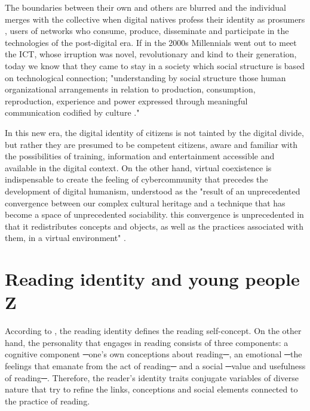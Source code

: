 \documentclass[english]{textolivre}
\begin{document}
The boundaries between their own and others are blurred and the individual merges with the collective when digital natives profess their identity as prosumers \cite{toffler_tercera_1981, friedman_tierra_2005, cassany2013leer}, users of networks who consume, produce, disseminate and participate in the technologies of the post-digital era. If in the 2000s Millennials went out to meet the ICT, whose irruption was novel, revolutionary and kind to their generation, today we know that they came to stay in a society which social structure is based on technological connection; "understanding by social structure those human organizational arrangements in relation to production, consumption, reproduction, experience and power expressed through meaningful communication codified by culture \cite[p.51]{castells_comunicacion_2009}."

In this new era, the digital identity of citizens is not tainted by the digital divide, but rather they are presumed to be competent citizens, aware and familiar with the possibilities of training, information and entertainment accessible and available in the digital context. On the other hand, virtual coexistence is indispensable to create the feeling of cybercommunity that precedes the development of digital humanism, understood as the "result of an unprecedented convergence between our complex cultural heritage and a technique that has become a space of unprecedented sociability. this convergence is unprecedented in that it redistributes concepts and objects, as well as the practices associated with them, in a virtual environment" \cite[p.33]{doueihi2011humanismo}.



\section{Reading identity and young people Z}
According to \textcite{aliagas_aunque_2009}, the reading identity defines the reading self-concept. On the other hand, the personality that engages in reading consists of three components: a cognitive component ─one's own conceptions about reading─, an emotional ─the feelings that emanate from the act of reading─ and a social ─value and usefulness of reading─. Therefore, the reader's identity traits conjugate variables of diverse nature that try to refine the links, conceptions and social elements connected to the practice of reading. 
\end{document}
